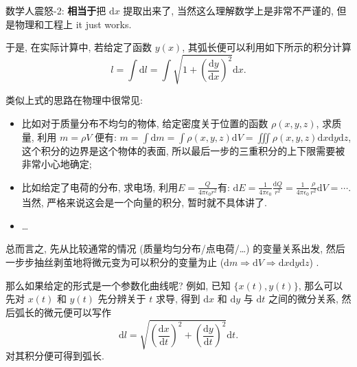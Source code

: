 \begin{newquote}
数学人震怒-2: \textbf{相当于}把 \(\mathrm{d}x\) 提取出来了,
当然这么理解数学上是非常不严谨的, 但是物理和工程上 it just works.
\end{newquote}

于是, 在实际计算中, 若给定了函数 \(y(x)\),
其弧长便可以利用如下所示的积分计算 \[
l=\int\mathrm{d}l=\int\sqrt{1+\left(\frac{\mathrm{d}y}{\mathrm{d}x}\right)^2}\mathrm{d}x.
\]

\begin{newquote}
类似上式的思路在物理中很常见:

\begin{itemize}
\item
  比如对于质量分布不均匀的物体, 给定密度关于位置的函数 \(\rho(x,y,z)\),
  求质量, 利用 \(m=\rho V\) 便有:
  \(m=\int\mathrm{d}m=\int\rho(x,y,z)\mathrm{d}V=\iiint\rho(x,y,z)\mathrm{d}x\mathrm{d}y\mathrm{d}z\),
  这个积分的边界是这个物体的表面,
  所以最后一步的三重积分的上下限需要被非常小心地确定;
\item
  比如给定了电荷的分布, 求电场,
  利用\(E=\frac{Q}{4\pi\epsilon_0 r^2}\)有:
  \(\mathrm{d}E=\frac{1}{4\pi\epsilon_0}\frac{\mathrm{d}Q}{r^2}=\frac{1}{4\pi\epsilon_0}\frac{\rho}{r^2}\mathrm{d}V=\cdots\).
  当然, 严格来说这会是一个向量的积分, 暂时就不具体讲了.
\item
  \ldots{}
\end{itemize}

总而言之, 先从比较通常的情况 (质量均匀分布/点电荷/\ldots)
的变量关系出发, 然后一步步抽丝剥茧地将微元变为可以积分的变量为止
(\(\mathrm{d}m\Rightarrow \mathrm{d}V\Rightarrow\mathrm{d}x\mathrm{d}y\mathrm{d}z\))
.
\end{newquote}

那么如果给定的形式是一个参数化曲线呢? 例如, 已知 \(\{x(t),y(t)\}\),
那么可以先对 \(x(t)\) 和 \(y(t)\) 先分辨关于 \(t\) 求导, 得到
\(\mathrm{d}x\) 和 \(\mathrm{d}y\) 与 \(\mathrm{d}t\) 之间的微分关系,
然后弧长的微元便可以写作 \[
\mathrm{d}l=\sqrt{\left(\frac{\mathrm{d}x}{\mathrm{d}t}\right)^2+\left(\frac{\mathrm{d}y}{\mathrm{d}t}\right)^2}\mathrm{d}t.
\] 对其积分便可得到弧长.
